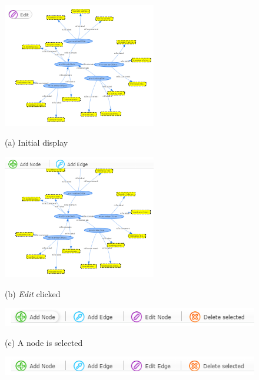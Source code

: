 \begin{figure}[htb]

\begin{minipage}[b]{.48\linewidth}
  \centering
  \centerline{\includegraphics[width=6.7cm]{img/edit_not_clicked.png}}
  \centerline{(a) Initial display}\medskip
\end{minipage}
\hfill
\begin{minipage}[b]{0.48\linewidth}
  \centering
  \centerline{\includegraphics[width=6.7cm]{img/edit_clicked.png}}
  \centerline{(b) \textit{Edit} clicked}\medskip
\end{minipage}
\begin{minipage}[b]{\linewidth}
  \centering
  \centerline{\includegraphics[width=13cm]{img/edit_node_selected.png}}
  \centerline{(c) A node is selected}\medskip
\end{minipage}
\hfill
\begin{minipage}[b]{\linewidth}
  \centering
  \centerline{\includegraphics[width=13cm]{img/edit_edge_selected.png}}

\end{minipage}
\end{figure}

